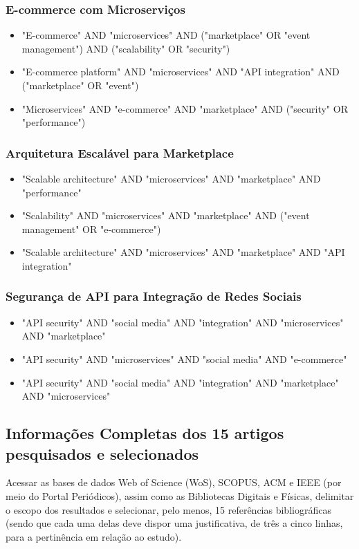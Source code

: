 \documentclass[a4paper,12pt]{article}
\begin{document}
\subsubsection{E-commerce com Microserviços}
\begin{itemize}
    \item "E-commerce" AND "microservices" AND ("marketplace" OR "event management") AND ("scalability" OR "security")
    \item "E-commerce platform" AND "microservices" AND "API integration" AND ("marketplace" OR "event")
    \item "Microservices" AND "e-commerce" AND "marketplace" AND ("security" OR "performance")
\end{itemize}

\subsubsection{Arquitetura Escalável para Marketplace}
\begin{itemize}
    \item "Scalable architecture" AND "microservices" AND "marketplace" AND "performance"
    \item "Scalability" AND "microservices" AND "marketplace" AND ("event management" OR "e-commerce")
    \item "Scalable architecture" AND "microservices" AND "marketplace" AND "API integration"
\end{itemize}

\subsubsection{Segurança de API para Integração de Redes Sociais}
\begin{itemize}
    \item "API security" AND "social media" AND "integration" AND "microservices" AND "marketplace"
    \item "API security" AND "microservices" AND "social media" AND "e-commerce"
    \item "API security" AND "social media" AND "integration" AND "marketplace" AND "microservices"
\end{itemize}

\subsection{Informações Completas dos 15 artigos pesquisados e selecionados}
Acessar as bases de dados Web of Science (WoS), SCOPUS, ACM e IEEE (por meio do Portal Periódicos), assim como as Bibliotecas Digitais e Físicas, delimitar o escopo dos resultados e selecionar, pelo menos, 15 referências bibliográficas (sendo que cada uma delas deve dispor uma justificativa, de três a cinco linhas, para a pertinência em relação ao estudo).
\end{document}
